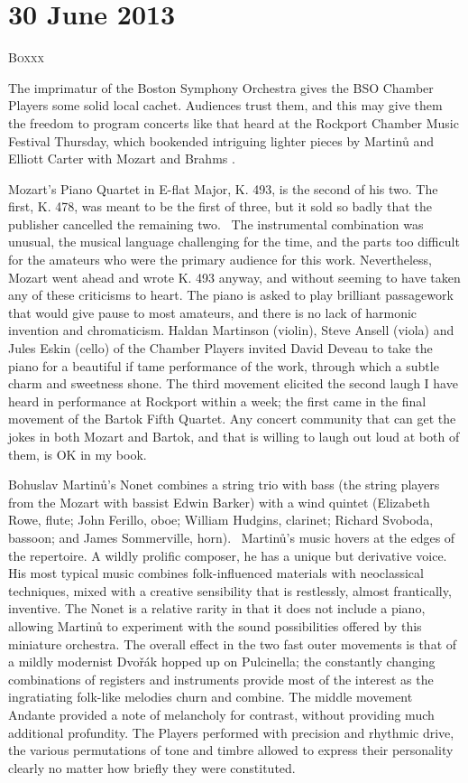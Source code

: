 \chapter{30 June 2013}

\textsc{Boxxx}

The imprimatur of the Boston Symphony Orchestra gives the BSO Chamber Players some solid local cachet. Audiences trust them, and this may give them the freedom to program concerts like that heard at the Rockport Chamber Music Festival Thursday, which bookended intriguing lighter pieces by Martinů and Elliott Carter with Mozart and Brahms .

Mozart's Piano Quartet in E-flat Major, K. 493, is the second of his two. The first, K. 478, was meant to be the first of three, but it sold so badly that the publisher cancelled the remaining two.  The instrumental combination was unusual, the musical language challenging for the time, and the parts too difficult for the amateurs who were the primary audience for this work. Nevertheless, Mozart went ahead and wrote K. 493 anyway, and without seeming to have taken any of these criticisms to heart. The piano is asked to play brilliant passagework that would give pause to most amateurs, and there is no lack of harmonic invention and chromaticism. Haldan Martinson (violin), Steve Ansell (viola) and Jules Eskin (cello) of the Chamber Players invited David Deveau to take the piano for a beautiful if tame performance of the work, through which a subtle charm and sweetness shone. The third movement elicited the second laugh I have heard in performance at Rockport within a week; the first came in the final movement of the Bartok Fifth Quartet. Any concert community that can get the jokes in both Mozart and Bartok, and that is willing to laugh out loud at both of them, is OK in my book.

Bohuslav Martinů’s Nonet combines a string trio with bass (the string players from the Mozart with bassist Edwin Barker) with a wind quintet (Elizabeth Rowe, flute; John Ferillo, oboe; William Hudgins, clarinet; Richard Svoboda, bassoon; and James Sommerville, horn).  Martinů’s music hovers at the edges of the repertoire. A wildly prolific composer, he has a unique but derivative voice. His most typical music combines folk-influenced materials with neoclassical techniques, mixed with a creative sensibility that is restlessly, almost frantically, inventive. The Nonet is a relative rarity in that it does not include a piano, allowing Martinů to experiment with the sound possibilities offered by this miniature orchestra. The overall effect in the two fast outer movements is that of a mildly modernist Dvořák hopped up on Pulcinella; the constantly changing combinations of registers and instruments provide most of the interest as the ingratiating folk-like melodies churn and combine. The middle movement Andante provided a note of melancholy for contrast, without providing much additional profundity. The Players performed with precision and rhythmic drive, the various permutations of tone and timbre allowed to express their personality clearly no matter how briefly they were constituted.

